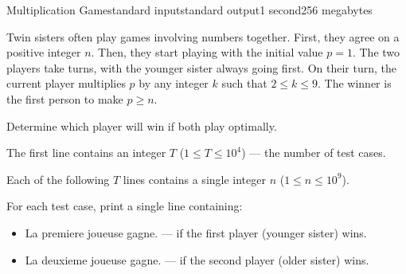 \begin{problem}{Multiplication Game}{standard input}{standard output}{1 second}{256 megabytes}

Twin sisters often play games involving numbers together. 
First, they agree on a positive integer $n$. 
Then, they start playing with the initial value $p = 1$. 
The two players take turns, with the younger sister always going first. On their turn, the current player multiplies $p$ by any integer $k$ such that $2 \le k \le 9$.
The winner is the first person to make $p \ge n$.

Determine which player will win if both play optimally.

\InputFile
The first line contains an integer $T$ ($1 \le T \le 10^4$) --- the number of test cases.\

Each of the following $T$ lines contains a single integer $n$ ($1 \le n \le 10^9$).

\OutputFile
For each test case, print a single line containing:

\begin{itemize}
    \item La premiere joueuse gagne. --- if the first player (younger sister) wins.
    \item La deuxieme joueuse gagne. --- if the second player (older sister) wins.
\end{itemize}

\Example

\begin{example}
%
\end{example}

\end{problem}

